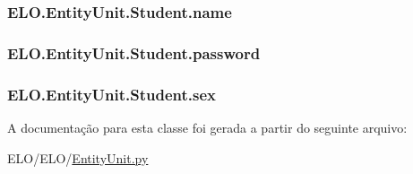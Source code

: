 \hypertarget{classELO_1_1EntityUnit_1_1Student_a33329ec1da0181f6305626b4444a8e0b}{
\subsubsection[{name}]{\setlength{\rightskip}{0pt plus 5cm}E\-L\-O.\-Entity\-Unit.\-Student.\-name}}\label{classELO_1_1EntityUnit_1_1Student_a33329ec1da0181f6305626b4444a8e0b}
\hypertarget{classELO_1_1EntityUnit_1_1Student_a834cad492221bfe3f26e590666e13f9a}{
\subsubsection[{password}]{\setlength{\rightskip}{0pt plus 5cm}E\-L\-O.\-Entity\-Unit.\-Student.\-password}}\label{classELO_1_1EntityUnit_1_1Student_a834cad492221bfe3f26e590666e13f9a}
\hypertarget{classELO_1_1EntityUnit_1_1Student_a5ca85c1d00044512e5dc3cfabac4ff9f}{
\subsubsection[{sex}]{\setlength{\rightskip}{0pt plus 5cm}E\-L\-O.\-Entity\-Unit.\-Student.\-sex}}\label{classELO_1_1EntityUnit_1_1Student_a5ca85c1d00044512e5dc3cfabac4ff9f}


A documentação para esta classe foi gerada a partir do seguinte arquivo\-:\begin{DoxyCompactItemize}
\item 
E\-L\-O/\-E\-L\-O/\hyperlink{EntityUnit_8py}{Entity\-Unit.\-py}\end{DoxyCompactItemize}
